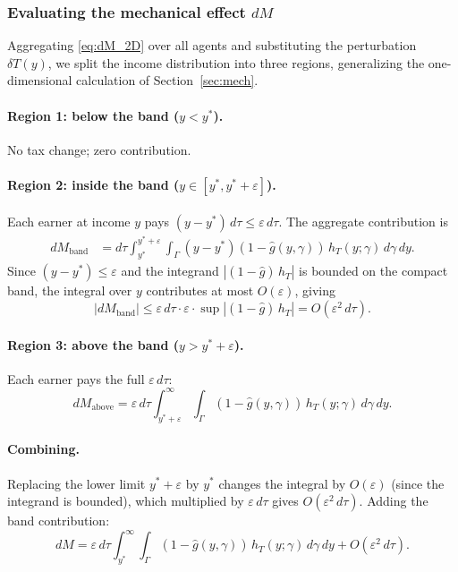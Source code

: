 \documentclass[12pt,a4paper]{article}
\theoremstyle{definition}
\theoremstyle{plain}
\theoremstyle{remark}
\begin{document}
\subsubsection{Evaluating the mechanical effect $dM$}

Aggregating \eqref{eq:dM_2D} over all agents and substituting the perturbation $\delta T(y)$, we split the income distribution into three regions, generalizing the one-dimensional calculation of Section~\ref{sec:mech}.

\paragraph{Region 1: below the band ($y < y^*$).}  No tax change; zero contribution.

\paragraph{Region 2: inside the band ($y \in [y^*,y^*+\varepsilon]$).}
Each earner at income $y$ pays $(y - y^*)\,d\tau \leq \varepsilon\,d\tau$.  The aggregate contribution is
\begin{align*}
  dM_{\text{band}} &= d\tau \int_{y^*}^{y^*+\varepsilon}\int_{\Gamma} (y-y^*)(1-\hat{g}(y,\gamma))\,h_T(y;\gamma)\,d\gamma\,dy.
\end{align*}
Since $(y - y^*) \leq \varepsilon$ and the integrand $|(1-\hat{g})\,h_T|$ is bounded on the compact band, the integral over $y$ contributes at most $O(\varepsilon)$, giving
\[
  |dM_{\text{band}}| \leq \varepsilon\,d\tau \cdot \varepsilon \cdot \sup|(1-\hat{g})\,h_T| = O(\varepsilon^2\,d\tau).
\]

\paragraph{Region 3: above the band ($y > y^*+\varepsilon$).}
Each earner pays the full $\varepsilon\,d\tau$:
\[
  dM_{\text{above}} = \varepsilon\,d\tau \int_{y^*+\varepsilon}^{\infty}\int_{\Gamma} (1-\hat{g}(y,\gamma))\,h_T(y;\gamma)\,d\gamma\,dy.
\]

\paragraph{Combining.}
Replacing the lower limit $y^*+\varepsilon$ by $y^*$ changes the integral by $O(\varepsilon)$ (since the integrand is bounded), which multiplied by $\varepsilon\,d\tau$ gives $O(\varepsilon^2\,d\tau)$.  Adding the band contribution:
\begin{equation}
\label{eq:dM_2D_combined}
  dM = \varepsilon\,d\tau \int_{y^*}^{\infty}\int_{\Gamma} (1-\hat{g}(y,\gamma))\,h_T(y;\gamma)\,d\gamma\,dy + O(\varepsilon^2\,d\tau).
\end{equation}
\end{document}
